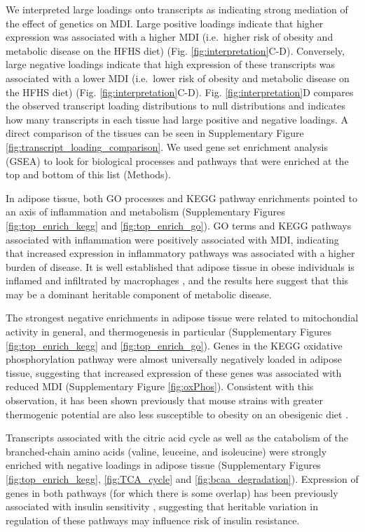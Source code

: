 \documentclass[
]{article}
\begin{document}
We interpreted large loadings onto transcripts as indicating strong
mediation of the effect of genetics on MDI. Large positive loadings
indicate that higher expression was associated with a higher MDI
(i.e.~higher risk of obesity and metabolic disease on the HFHS diet)
(Fig. \ref{fig:interpretation}C-D). Conversely, large negative loadings
indicate that high expression of these transcripts was associated with a
lower MDI (i.e.~lower risk of obesity and metabolic disease on the HFHS
diet) (Fig. \ref{fig:interpretation}C-D). Fig. \ref{fig:interpretation}D
compares the observed transcript loading distributions to null
distributions and indicates how many transcripts in each tissue had
large positive and negative loadings. A direct comparison of the tissues
can be seen in Supplementary Figure
\ref{fig:transcript_loading_comparison}. We used gene set enrichment
analysis (GSEA) \cite{fgsea, 
pmid16199517} to look for biological processes and pathways that were
enriched at the top and bottom of this list (Methods).

In adipose tissue, both GO processes and KEGG pathway enrichments
pointed to an axis of inflammation and metabolism (Supplementary Figures
\ref{fig:top_enrich_kegg} and \ref{fig:top_enrich_go}). GO terms and
KEGG pathways associated with inflammation were positively associated
with MDI, indicating that increased expression in inflammatory pathways
was associated with a higher burden of disease. It is well established
that adipose tissue in obese individuals is inflamed and infiltrated by
macrophages \cite{pmid19133410, 
pmid28955384, pmid28912810, pmid28901330, pmid24969772}, and the results
here suggest that this may be a dominant heritable component of
metabolic disease.

The strongest negative enrichments in adipose tissue were related to
mitochondial activity in general, and thermogenesis in particular
(Supplementary Figures \ref{fig:top_enrich_kegg} and
\ref{fig:top_enrich_go}). Genes in the KEGG oxidative phosphorylation
pathway were almost universally negatively loaded in adipose tissue,
suggesting that increased expression of these genes was associated with
reduced MDI (Supplementary Figure \ref{fig:oxPhos}). Consistent with
this observation, it has been shown previously that mouse strains with
greater thermogenic potential are also less susceptible to obesity on an
obesigenic diet \cite{pmid18492779}.

Transcripts associated with the citric acid cycle as well as the
catabolism of the branched-chain amino acids (valine, leuceine, and
isoleucine) were strongly enriched with negative loadings in adipose
tissue (Supplementary Figures \ref{fig:top_enrich_kegg},
\ref{fig:TCA_cycle} and \ref{fig:bcaa_degradation}). Expression of genes
in both pathways (for which there is some overlap) has been previously
associated with insulin sensitivity \cite{pmid29567659, 
pmid22560213, pmid19841271}, suggesting that heritable variation in
regulation of these pathways may influence risk of insulin resistance.
\end{document}
